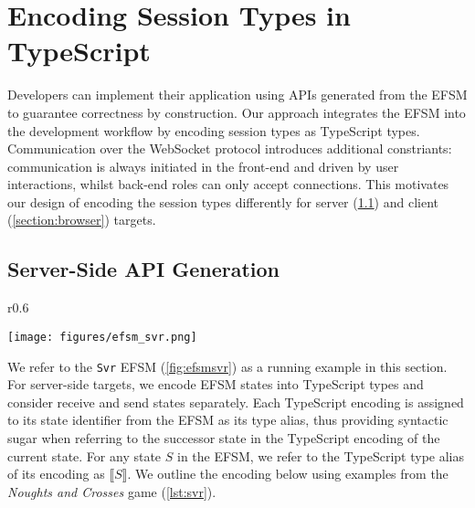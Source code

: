 \section{Encoding Session Types in TypeScript}

Developers can implement their application using APIs generated from the EFSM
to guarantee correctness by construction.
Our approach integrates the EFSM into the development workflow by encoding
session types as TypeScript types.
Communication over the WebSocket protocol introduces additional constriants:
communication is always initiated in the front-end and driven by user interactions,
whilst back-end roles can only accept connections.
This motivates our design of encoding the session types differently for server (\cref{section:server}) and client (\cref{section:browser}) targets.



\subsection{Server-Side API Generation}
\label{section:server}


\begin{wrapfigure}{r}{0.6\textwidth}
  \vspace{-5mm}
  \begin{center}
    \texttt{[image: figures/efsm\_svr.png]}
  \end{center}

  \vspace{-5mm}
  \label{fig:efsmsvr}
\vspace{-1cm}
\end{wrapfigure}

We refer to the \texttt{Svr} EFSM (\cref{fig:efsmsvr}) as a running example in
this section.
For server-side targets, we encode EFSM states into TypeScript types and
consider receive and send states separately.
Each TypeScript encoding is assigned to its state identifier from the EFSM as
its type alias, thus providing syntactic sugar when referring to the successor
state in the TypeScript encoding of the current state.
For any state $S$ in the EFSM, we refer to the TypeScript type alias of its
encoding as $\llbracket S \rrbracket$. We outline the encoding below using examples from the
\textit{Noughts and Crosses} game (\cref{lst:svr}).

